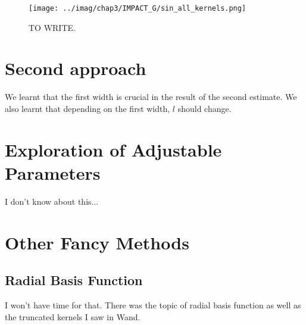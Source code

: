 \documentclass[11pt]{book}
\begin{document}
\begin{figure}
\centering
\texttt{[image: ../imag/chap3/IMPACT\_G/sin\_all\_kernels.png]}
\caption{TO WRITE.}
\label{fig:impact_g_sin}
\end{figure}




\section{Second approach}
We learnt that the first width is crucial in the result of the second estimate. We also learnt that depending on the first width, $l$ should change. 







\section{Exploration of Adjustable Parameters}
\label{section:exploration}


I don't know about this...
































\section{Other Fancy Methods}
\subsection{Radial Basis Function}

I won't have time for that. There was the topic of radial basis function as well as the truncated kernels I saw in Wand. 


\end{document}
